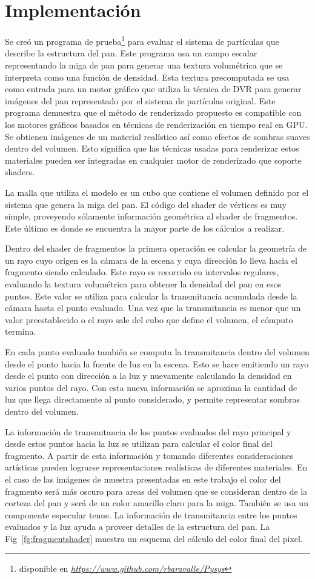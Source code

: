 \documentclass[spanish,a4paper,11pt,oneside,links]{report}
\begin{document}
\section{Implementación}
Se cre\'o un programa de prueba\footnote{disponible en \emph{\url{https://www.github.com/rbaravalle/Pysys}}} para evaluar el sistema de partículas que describe la estructura del pan. Este programa usa un campo escalar representando la miga de pan para generar una textura volumétrica que se interpreta como una función de densidad. Esta textura precomputada se usa como entrada para un motor gráfico que utiliza la técnica de DVR para generar imágenes del pan representado por el sistema de partículas original. Este programa demuestra que el método de renderizado propuesto es compatible con los motores gráficos basados en técnicas de renderización en tiempo real en GPU. Se obtienen imágenes de un material realístico así como efectos de sombras suaves dentro del volumen. Esto significa que las técnicas usadas para renderizar estos materiales pueden ser integradas en cualquier motor de renderizado que soporte shaders.

La malla que utiliza el modelo es un cubo que contiene el volumen definido por el sistema que genera la miga del pan. El código del shader de vértices es muy simple, proveyendo sólamente información geométrica al shader de fragmentos. Este último es donde se encuentra la mayor parte de los cálculos a realizar.

Dentro del shader de fragmentos la primera operaci\'on es calcular la geometría de un rayo cuyo origen es la cámara de la escena y cuya dirección lo lleva hacia el fragmento siendo calculado. Este rayo es recorrido en intervalos regulares, evaluando la textura volumétrica para obtener la densidad del pan en esos puntos. Este valor se utiliza para calcular la transmitancia acumulada desde la cámara hasta el punto evaluado. Una vez que la transmitancia es menor que un valor preestablecido o el rayo sale del cubo que define el volumen, el cómputo termina.

En cada punto evaluado también se computa la transmitancia dentro del volumen desde el punto hacia la fuente de luz en la escena. Esto se hace emitiendo un rayo desde el punto con dirección a la luz y nuevamente calculando la densidad en varios puntos del rayo. Con esta nueva información se aproxima la cantidad de luz que llega directamente al punto considerado, y permite representar sombras dentro del volumen.

La información de transmitancia de los puntos evaluados del rayo principal y desde estos puntos hacia la luz se utilizan para calcular el color final del fragmento. A partir de esta información y tomando diferentes consideraciones artísticas pueden lograrse representaciones realísticas de diferentes materiales. En el caso de las imágenes de muestra presentadas en este trabajo el color del fragmento será más oscuro para areas del volumen que se consideran dentro de la corteza del pan y será de un color amarillo claro para la miga. También se usa un componente especular tenue. La información de transmitancia entre los puntos evaluados y la luz ayuda a proveer detalles de la estructura del pan. La Fig~\ref{fg:fragmentshader} muestra un esquema del cálculo del color final del pixel.
\end{document}
